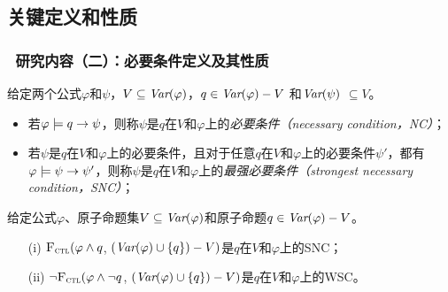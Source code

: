 \documentclass[aspectratio=1610, 9pt, CJK]{beamer}
\begin{document}
\subsection{关键定义和性质}
\begin{frame}
	\frametitle{~研究内容（二）：必要条件定义及其性质}
		\begin{definition}[必要条件]\label{def:NC:SC}
			给定两个公式$\varphi$和$\psi$，$V \subseteq \textit{Var}(\varphi)$，$q\in\textit{Var}(\varphi)- V$
			和$\textit{Var}(\psi)$ $\subseteq V$。
			\begin{itemize}
				\item 若$\varphi \models q \rightarrow \psi$，则称$\psi$是$q$在$V$和$\varphi$上的{\em 必要条件（necessary condition，NC）}；
				\item 若$\psi$是$q$在$V$和$\varphi$上的必要条件，且对于任意$q$在$V$和$\varphi$上的必要条件$\psi'$，都有$\varphi\models\psi\rightarrow\psi'$，则称$\psi$是$q$在$V$和$\varphi$上的{\em 最强必要条件（strongest necessary condition，SNC）}；
			\end{itemize}
		\end{definition}
		\begin{theorem} 
			给定公式$\varphi$、原子命题集$V\subseteq\textit{Var}(\varphi)$和原子命题$q\in\textit{Var}(\varphi)- V$。
			\begin{itemize}
				\item[(i)] ${\textsc{F}_{\textsc{ctl}}} (\varphi \land q$, $(\textit{Var}(\varphi) \cup \{q\}) - V)$是$q$在$V$和$\varphi$上的SNC；
				\item[(ii)]  $\neg{\textsc{F}_{\textsc{ctl}}} (\varphi \land \neg q$, $(\textit{Var}(\varphi) \cup \{q\}) - V)$是$q$在$V$和$\varphi$上的WSC。
			\end{itemize}
		\end{theorem} 
\end{frame}
\end{document}
